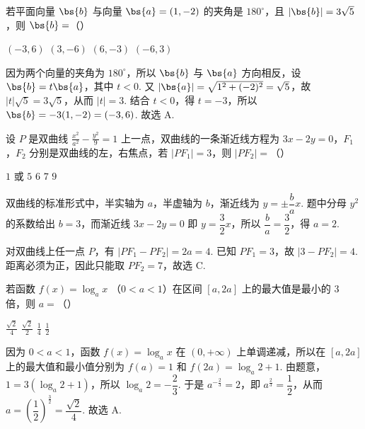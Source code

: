 \begin{problem}
若平面向量 \(\bs{b}\) 与向量 \(\bs{a} = (1, -2)\) 的夹角是 \(180^{\circ}\)，且 \(\left|\bs{b}\right| = 3\sqrt{5}\)，则 \(\bs{b} =\)（\quad）

\choices
    {\((-3,6)\)}
    {\((3, - 6)\)}
    {\((6, - 3)\)}
    {\((-6,3)\)}
\begin{solution}
因为两个向量的夹角为 \(180^{\circ}\)，所以 \(\bs{b}\) 与 \(\bs{a}\) 方向相反，设 \(\bs{b}=t\bs{a}\)，其中 \(t<0\). 又 \(\left|\bs{a}\right|=\sqrt{1^2+(-2)^2}=\sqrt5\)，故
\(\left|t\right|\sqrt5=3\sqrt5\)，从而 \(\left|t\right|=3\). 结合 \(t<0\)，得 \(t=-3\)，所以
\(\bs{b}=-3(1,-2)=(-3,6)\). 故选 A.
\end{solution}
\end{problem}

\begin{problem}
设 \(P\) 是双曲线 \(\frac{x^2}{a^2} - \frac{y^2}{9} = 1\) 上一点，双曲线的一条渐近线方程为 \(3x - 2y = 0\)，\(F_1\)，\(F_2\) 分别是双曲线的左，右焦点，若 \(|PF_1| = 3\)，则 \(|PF_2| =\)（\quad）

\choices
    {\(1\) 或 \(5\)}
    {\(6\)}
    {\(7\)}
    {\(9\)}
\begin{solution}
双曲线的标准形式中，半实轴为 \(a\)，半虚轴为 \(b\)，渐近线为 \(y=\pm\dfrac{b}{a}x\). 题中分母 \(y^2\) 的系数给出 \(b=3\)，而渐近线 \(3x-2y=0\) 即 \(y=\dfrac32x\)，所以 \(\dfrac{b}{a}=\dfrac32\)，得 \(a=2\).

对双曲线上任一点 \(P\)，有 \(\left|PF_1-PF_2\right|=2a=4\). 已知 \(PF_1=3\)，故 \(\left|3-PF_2\right|=4\). 距离必须为正，因此只能取 \(PF_2=7\)，故选 C.
\end{solution}
\end{problem}

\begin{problem}
若函数 \( f(x) = \log_a x \) （\( 0 < a < 1 \)）在区间 \([a, 2a]\) 上的最大值是最小的 \(3\) 倍，则 \( a = \)（\quad）

\choices
    {\(\frac{\sqrt{2}}{4}\)}
    {\(\frac{\sqrt{2}}{2}\)}
    {\(\frac{1}{4}\)}
    {\(\frac{1}{2}\)}
\begin{solution}
因为 \(0<a<1\)，函数 \(f(x)=\log_a x\) 在 \((0,+\infty)\) 上单调递减，所以在 \([a,2a]\) 上的最大值和最小值分别为
\(f(a)=1\) 和 \(f(2a)=\log_a2+1\). 由题意，
\(1=3\left(\log_a2+1\right)\)，所以 \(\log_a2=-\dfrac23\). 于是
\(a^{-\frac23}=2\)，即 \(a^{\frac23}=\dfrac12\)，从而
\(a=\left(\dfrac12\right)^{\frac32}=\dfrac{\sqrt2}{4}\). 故选 A.
\end{solution}
\end{problem}

